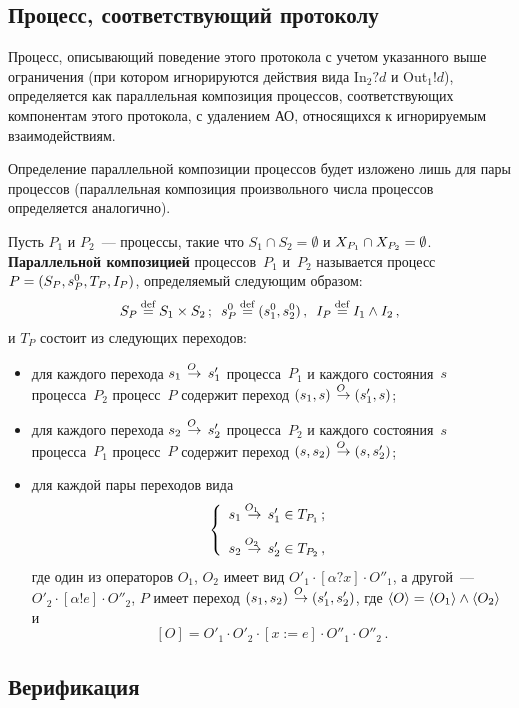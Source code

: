\begin{multicols}{2}
\subsection{Процесс, соответствующий протоколу}

Процесс, описывающий поведение этого протокола с учетом указанного выше ограничения
(при котором игнорируются действия вида In$_2 ? d$ и Out$_1 ! d$),
определяется как параллельная композиция процессов, соответствующих компонентам
этого протокола, с удалением АО,
относящихся к игнорируемым взаимодействиям.

Определение параллельной композиции процессов будет изложено
лишь для пары процессов (параллельная композиция
произвольного числа процессов определяется аналогично).

Пусть $P_1$ и $P_2$~--- процессы, такие что $S_1\cap S_2=\emptyset$
и $X_{P_1}\cap X_{P_2}\hm=\emptyset$.
{\bf Параллельной композицией} процессов~$P_1$ и~$P_2$
называется процесс $P\hm=(S_P, s^0_P,  T_P, I_P)$,  определяемый следующим образом:
$$
S_P \mathbin{{\mathop{=}\limits^{\mathrm{def}}}} S_1\times S_2\,;\enskip
s^0_P\mathbin{{\mathop{=}\limits^{\mathrm{def}}}} (s^0_1, s^0_2)\,,\enskip
I_P\mathbin{{\mathop{=}\limits^{\mathrm{def}}}} I_1\wedge I_2\,,
$$
и $T_P$ состоит из следующих переходов:
\begin{itemize}
\item для каждого перехода $s_1\;\mathop{\to}\limits^{\!\!\!O}\;s'_1$
процесса~$P_1$ и каждого состояния~$s$ процесса~$P_2$
процесс~$P$ содержит переход $(s_1,s)\;\mathop{\to}\limits^{\!\!\!O}\;(s'_1,s)$;

\item для каждого перехода $s_2\;\mathop{\to}\limits^{\!\!\!O}\;s'_2$
процесса~$P_2$ и каждого состояния~$s$ процесса~$P_1$
процесс~$P$ содержит переход $(s,s_2)\;\mathop{\to}\limits^{\!\!\!O}\;(s,s'_2)$;

\item для каждой пары переходов вида
$$
\left\{ \begin{array}{l}
s_1\;\mathop{\to}\limits^{\!\!\!O_1}\;s'_1\in T_{P_1}\,;\\[9pt]
s_2\;\mathop{\to}\limits^{\!\!\!O_2}\;s'_2\in T_{P_2}\,,\end{array}
\right.
$$
где один из операторов $O_1$, $O_2$ имеет вид $O'_1\cdot[\alpha?x]\cdot O''_1$,
а другой~--- $O'_2\cdot [\alpha!e]\cdot O''_2$,
 $P$ имеет переход $(s_1,s_2)\;\mathop{\to}\limits^{\!\!\!O}\;(s'_1,s'_2)$, где
$\langle{O}\rangle \hm= \langle{O_1}\rangle\wedge\langle{O_2}\rangle$ и
$$
[O]= O'_1\cdot O'_2\cdot [x:=e]\cdot O''_1\cdot O''_2\,.
$$
\end{itemize}

\vspace*{-8pt}

\subsection{Верификация}


\end{multicols}
